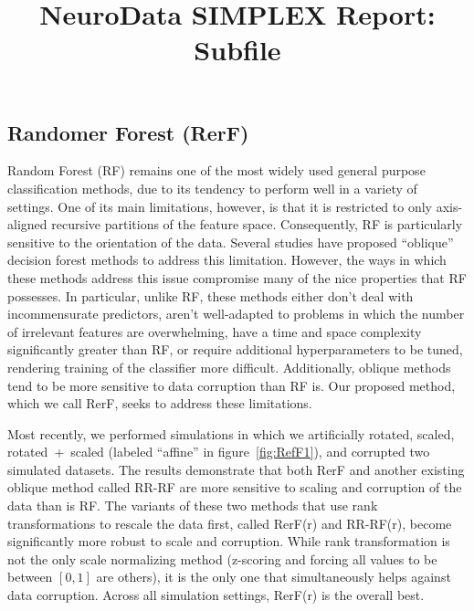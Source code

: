 \documentclass[simplex.tex]{subfiles}
\title{NeuroData SIMPLEX Report: Subfile}
\begin{document}

\subsection{Randomer Forest (RerF)}
Random Forest (RF) remains one of the most widely used general purpose
classification methods, due to its tendency to perform well in a variety of
settings. One of its main limitations, however, is that it is restricted to
only axis-aligned recursive partitions of the feature space. Consequently, RF
is particularly sensitive to the orientation of the data. Several studies have
proposed “oblique” decision forest methods to address this limitation. However,
the ways in which these methods address this issue compromise many of the nice
properties that RF possesses. In particular, unlike RF, these methods either
don’t deal with incommensurate predictors, aren’t well-adapted to problems in
which the number of irrelevant features are overwhelming, have a time and space
complexity significantly greater than RF, or require additional hyperparameters
to be tuned, rendering training of the classifier more difficult. Additionally,
oblique methods tend to be more sensitive to data corruption than RF is. Our
proposed method, which we call RerF, seeks to address these limitations. 	

Most recently, we performed simulations in which we artificially rotated,
scaled, 
rotated~+~scaled (labeled ``affine'' in figure~\ref{fig:RefF1}), and corrupted two
simulated datasets. The results demonstrate that both RerF and another existing
oblique method called RR-RF are more sensitive to scaling and corruption of the
data than is RF. The variants of these two methods that use rank
transformations to rescale the data first, called RerF(r) and RR-RF(r), become
significantly more robust to scale and corruption. While rank transformation is
not the only scale normalizing method (z-scoring and forcing all values to be
between $[0,1]$ are others), it is the only one that simultaneously helps against
data corruption. Across all simulation settings, RerF(r) is the overall best.
\end{document}
